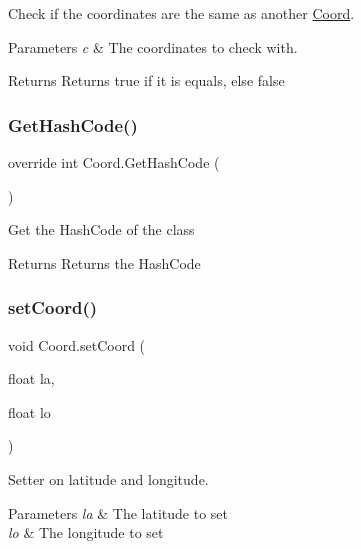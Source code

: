 Check if the coordinates are the same as another \hyperlink{structCoord}{Coord}. 


\begin{DoxyParams}{Parameters}
{\em c} & The coordinates to check with.\\
\hline
\end{DoxyParams}
\begin{DoxyReturn}{Returns}
Returns true if it is equals, else false
\end{DoxyReturn}
\mbox{\label{structCoord_ac51299e2985ea7e24e73b40667e572f5}} 
\subsubsection{\texorpdfstring{Get\+Hash\+Code()}{GetHashCode()}}
{\footnotesize\ttfamily override int Coord.\+Get\+Hash\+Code (\begin{DoxyParamCaption}{ }\end{DoxyParamCaption})\hspace{0.3cm}{\ttfamily [inline]}}



Get the Hash\+Code of the class 

\begin{DoxyReturn}{Returns}
Returns the Hash\+Code
\end{DoxyReturn}
\mbox{\label{structCoord_ab79364bcc0a8163ef89f35da474ab296}} 
\subsubsection{\texorpdfstring{set\+Coord()}{setCoord()}}
{\footnotesize\ttfamily void Coord.\+set\+Coord (\begin{DoxyParamCaption}\item[{float}]{la,  }\item[{float}]{lo }\end{DoxyParamCaption})\hspace{0.3cm}{\ttfamily [inline]}}



Setter on latitude and longitude. 


\begin{DoxyParams}{Parameters}
{\em la} & The latitude to set\\
\hline
{\em lo} & The longitude to set\\
\hline
\end{DoxyParams}
\mbox{\label{structCoord_a051a016fb4dcf8df16320d9d323f842e}} 

